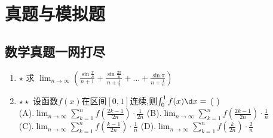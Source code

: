 \documentclass[12pt, a4paper, oneside, UTF8]{ctexbook}
\begin{document}
% 
\else
\fi
\chapter{真题与模拟题}
\section{数学真题一网打尽} 
\begin{enumerate}
    \item $\star$ 求 $\displaystyle \lim_{n\to\infty}\left(\frac{\sin\frac{\pi}{n}}{n+1}+
    \frac{\sin\frac{2\pi}{n}}{n+\frac{1}{2}}+\ldots+\frac{\sin\pi}{n+\frac{1}{n}}\right)$ 

    
    \item $\star\star$ 设函数$f(x)$在区间$\left[0,1\right]$连续,则$\int_{0}^{1}f(x)\d x = $ (   ) \\
    (A).$\displaystyle\lim_{n\to\infty}\sum_{k=1}^{n}f\left(\frac{2k-1}{2n}\right)\cdot\frac{1}{2n}$\qquad
    (B).$\displaystyle\lim_{n\to\infty}\sum_{k=1}^{n}f\left(\frac{2k-1}{2n}\right)\cdot\frac{1}{n}$\\
    (C).$\displaystyle\lim_{n\to\infty}\sum_{k=1}^{n}f\left(\frac{k-1}{2n}\right)\cdot\frac{1}{n}$\qquad
    (D).$\displaystyle\lim_{n\to\infty}\sum_{k=1}^{n}f\left(\frac{k}{2n}\right)\cdot\frac{2}{n}$\qquad


\end{enumerate}
\end{document}
